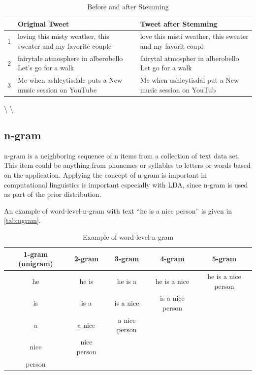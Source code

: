 \documentclass[]{article}
\begin{document}

\begin{table}[ht]
\centering
\begin{tabular}{rll}
  \hline
 & Original Tweet & Tweet after Stemming \\ 
  \hline
1 & loving this misty weather, this sweater and my favorite couple & love this misti weather, this sweater and my favorit coupl\\ 
  2 & fairytale atmosphere in alberobello  Let's go for a walk & fairytal atmospher in alberobello Let go for a walk\\ 
  3 & Me when ashleytisdale puts a New music session on YouTube & Me when ashleytisdal put a New music session on YouTub\\ 
   \hline
\end{tabular}
\caption{Before and after Stemming} 
\label{tab:stemmed}
\end{table}

\textbackslash{}
\textbackslash{}

\subsection{n-gram}\label{n-gram}

n-gram is a neighboring sequence of n items from a collection of text
data set. This item could be anything from phonemes or syllables to
letters or words based on the application. Applying the concept of
n-gram is important in computational linguistics is important especially
with LDA, since n-gram is used as part of the prior distribution.

An example of word-level-n-gram with text ``he is a nice person'' is
given in \autoref{tab:ngram}.

\begin{table}[ht]
\centering
\begin{tabular}{ccccc}
  \hline
 1-gram (unigram) & 2-gram & 3-gram & 4-gram & 5-gram\\ 
  \hline
he & he is & he is a & he is a nice & he is a nice person\\ 
is & is a & is a nice & is a nice person &\\ 
a & a nice & a nice person & &\\ 
nice & nice person & & &\\ 
person &  & & &\\ 
   \hline
\end{tabular}
\caption{Example of word-level-n-gram}
\label{tab:ngram}
\end{table}
\end{document}

